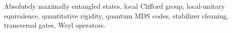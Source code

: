 Absolutely maximally entangled states, local Clifford group, local-unitary
equivalence, quantitative rigidity, quantum MDS codes, stabilizer cleaning,
transversal gates, Weyl operators.
